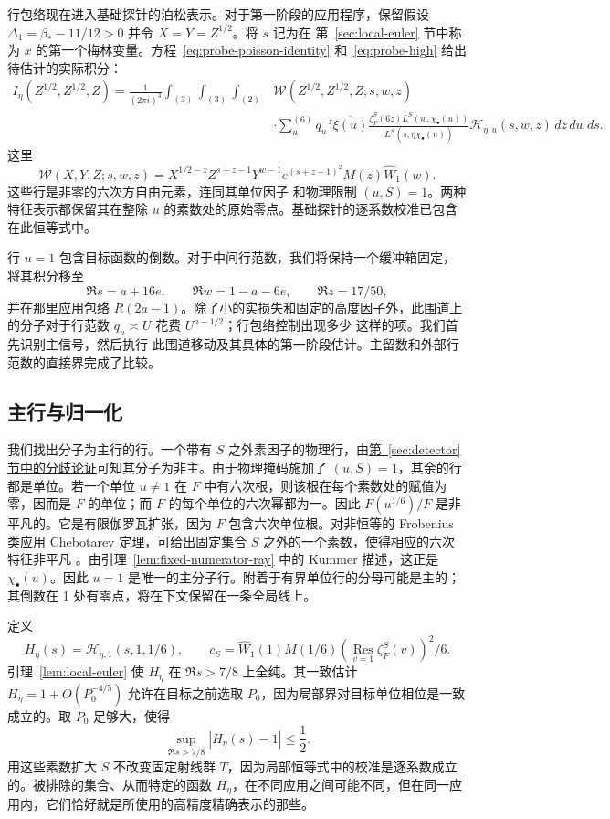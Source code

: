 \documentclass[11pt,a4paper]{article}
\numberwithin{equation}{section}
\numberwithin{figure}{section}
\theoremstyle{definition}
\theoremstyle{remark}
\begin{document}
行包络现在进入基础探针的泊松表示。对于第一阶段的应用程序，保留假设
$\Delta_1=\beta_*-11/12>0$ 并令
$X=Y=Z^{1/2}$。将 $s$ 记为在
第~\ref{sec:local-euler} 节中称为 $x$ 的第一个梅林变量。方程~\eqref{eq:probe-poisson-identity}
和~\eqref{eq:probe-high} 给出待估计的实际积分：
\[
\begin{split}
 I_\eta(Z^{1/2},Z^{1/2},Z)
 =\frac1{(2\pi i)^3}\int_{(3)}\int_{(3)}\int_{(2)}
 &\mathcal W(Z^{1/2},Z^{1/2},Z;s,w,z)\\
 &\cdot\sum_u^{(6)}q_u^{-z}\overline{\xi(u)}
 \frac{\zeta_F^S(6z)L^S(w,\chi_\bullet(u))}
      {L^S(s,\eta\overline{\chi_\bullet(u)})}
 \mathcal H_{\eta,u}(s,w,z)\,dz\,dw\,ds.
\end{split}
\]
这里
\[
 \mathcal W(X,Y,Z;s,w,z)=X^{1/2-z}Z^{s+z-1}Y^{w-1}
 e^{(s+z-1)^2}M(z)\widehat W_1(w).
\]
这些行是非零的六次方自由元素，连同其单位因子
和物理限制 $(u,S)=1$。两种特征表示都保留其在整除 $u$ 的素数处的原始零点。基础探针的逐系数校准已包含在此恒等式中。

行 $u=1$ 包含目标函数的倒数。对于中间行范数，我们将保持一个缓冲箱固定，将其积分移至
\[
 \Re s=a+16e,\qquad \Re w=1-a-6e,\qquad \Re z=17/50,
\]
并在那里应用包络 $R(2a-1)$。除了小的实损失和固定的高度因子外，此围道上的分子对于行范数 $q_u\asymp U$ 花费 $U^{a-1/2}$；行包络控制出现多少
这样的项。我们首先识别主信号，然后执行
此围道移动及其具体的第一阶段估计。主留数和外部行范数的直接界完成了比较。

\subsection{主行与归一化}我们找出分子为主行的行。一个带有 $S$ 之外素因子的物理行，由\hyperref[par:physical-row-ramification]{第~\ref*{sec:detector} 节中的分歧论证}可知其分子为非主。由于物理掩码施加了 $(u,S)=1$，其余的行都是单位。若一个单位 $u\ne1$ 在 $F$ 中有六次根，则该根在每个素数处的赋值为零，因而是 $F$ 的单位；而 $F$ 的每个单位的六次幂都为一。因此 $F(u^{1/6})/F$ 是非平凡的。它是有限伽罗瓦扩张，因为 $F$ 包含六次单位根。对非恒等的 Frobenius 类应用 Chebotarev 定理，可给出固定集合 $S$ 之外的一个素数，使得相应的六次特征非平凡 \cite[Theorem 1.1]{TZ}。由引理~\ref{lem:fixed-numerator-ray} 中的 Kummer 描述，这正是 $\chi_\bullet(u)$。因此 $u=1$ 是唯一的主分子行。附着于有界单位行的分母可能是主的；其倒数在 1 处有零点，将在下文保留在一条全局线上。

定义
\begin{equation}
 H_\eta(s)=\mathcal H_{\eta,1}(s,1,1/6),\qquad
 c_S=\widehat W_1(1)M(1/6)
       \left(\operatorname*{Res}_{v=1}\zeta_F^S(v)\right)^2/6.
 \label{eq:shared-principal-data}
\end{equation}
引理~\ref{lem:local-euler} 使 $H_\eta$ 在 $\Re s>7/8$ 上全纯。其一致估计 $H_\eta=1+O(P_0^{-4/5})$ 允许在目标之前选取 $P_0$，因为局部界对目标单位相位是一致成立的。取 $P_0$ 足够大，使得
\begin{equation}
 \sup_{\Re s>7/8}|H_\eta(s)-1|\le\frac12.
 \label{eq:shared-principal-nonvanishing}
\end{equation}
用这些素数扩大 $S$ 不改变固定射线群 $T$，因为局部恒等式中的校准是逐系数成立的。被排除的集合、从而特定的函数 $H_\eta$，在不同应用之间可能不同，但在同一应用内，它们恰好就是所使用的高精度精确表示的那些。
\end{document}
